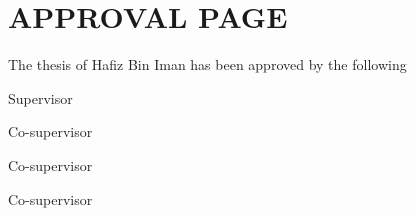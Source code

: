 
\chapter*{APPROVAL PAGE}

\begin{center}
The thesis of Hafiz Bin Iman has been approved by the following
\end{center}
\vspace{12pt}
\begin{center}
\par Supervisor
\end{center}
\vspace{24pt}
\begin{center}
\par Co-supervisor
\end{center}
\vspace{24pt}
\begin{center}
\par Co-supervisor
\end{center}
\vspace{24pt}
\begin{center}
\par Co-supervisor
\end{center}



